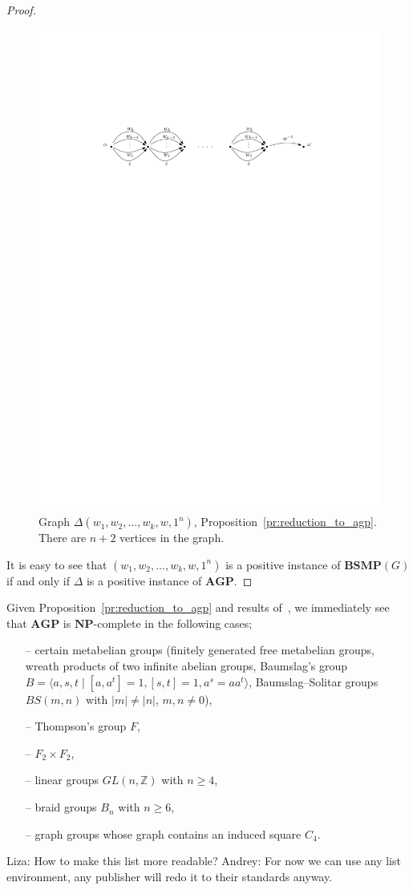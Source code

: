 \documentclass[10pt]{amsart}
\newcommand{\an}{\noindent\color{red} Andrey: }{}
\newcommand{\li}{\noindent\color{blue} Liza: }{}
\theoremstyle{definition}
\def\NP{{\mathbf{NP}}}
\def\BSMP{{\mathbf{BSMP}}}
\def\AGP{{\mathbf{AGP}}}
\begin{document}
\begin{proof}
\begin{figure}[h]
 \centering
 \includegraphics[width=4.5in]{bsmp}
 \caption{Graph $\Delta(w_1,w_2,\ldots,w_k,w,1^n)$, Proposition~\ref{pr:reduction_to_agp}. There are $n+2$ vertices in the graph.}\label{fi:BSMP}
\end{figure}
It is easy to see that $(w_1,w_2,\ldots,w_k,w,1^n)$ is a positive instance of $\BSMP(G)$ if and only if $\Delta$ is a positive instance of $\AGP$.
\end{proof}

Given Proposition~\ref{pr:reduction_to_agp} and results of~\cite{Miasnikov-Nikolaev-Ushakov:2014a}, we immediately see that $\AGP$ is $\NP$-complete in the following cases;
\begin{itemize}
\item[--] certain metabelian groups (finitely generated free metabelian groups, wreath products of two infinite abelian groups, Baumslag's group $B=\langle a,s,t\mid [a,a^t]=1, [s,t]=1, a^s=aa^t\rangle$, Baumslag--Solitar groups $BS(m,n)$ with $|m|\neq |n|$, $m,n\neq 0$),
\item[--] Thompson's group $F$,
\item[--] $F_2\times F_2$,
\item[--] linear groups $GL(n, \mathbb Z)$ with $n\ge 4$,
\item[--] braid groups $B_n$ with $n\ge 6$,
\item[--] graph groups whose graph contains an induced square $C_4$.
\end{itemize}   
{\li{How to make this list more readable?} {\an For now we can use any list environment, any publisher will redo it to their standards anyway.}}
\end{document}
